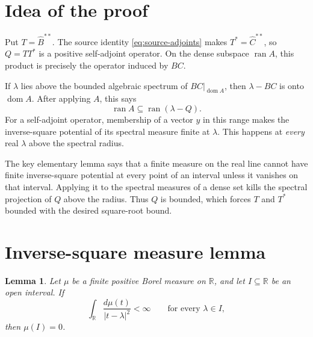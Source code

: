 \documentclass[11pt]{article}
\newtheorem{lemma}{Lemma}
\newcommand{\R}{\mathbb R}
\newcommand{\domA}{\operatorname{dom}A}
\newcommand{\ran}{\operatorname{ran}}
\begin{document}
\section*{Idea of the proof}

Put \(T=\widehat B^{**}\).  The source identity
\eqref{eq:source-adjoints} makes \(T^*=\widehat C^{**}\), so
\(Q=TT^*\) is a positive self-adjoint operator.  On the dense subspace
\(\ran A\), this product is precisely the operator induced by \(BC\).

If \(\lambda\) lies above the bounded algebraic spectrum of
\(BC|_{\domA}\), then \(\lambda-BC\) is onto \(\domA\).  After applying \(A\),
this says
\[
 \ran A\subseteq\ran(\lambda-Q).
\]
For a self-adjoint operator, membership of a vector \(y\) in this range makes
the inverse-square potential of its spectral measure finite at \(\lambda\).
This happens at \emph{every} real \(\lambda\) above the spectral radius.

The key elementary lemma says that a finite measure on the real line cannot
have finite inverse-square potential at every point of an interval unless it
vanishes on that interval.  Applying it to the spectral measures of a dense
set kills the spectral projection of \(Q\) above the radius.  Thus \(Q\) is
bounded, which forces \(T\) and \(T^*\) bounded with the desired square-root
bound.

\section*{Inverse-square measure lemma}

\begin{lemma}\label{lem:measure}
Let \(\mu\) be a finite positive Borel measure on \(\R\), and let
\(I\subseteq\R\) be an open interval.  If
\begin{equation}\label{eq:potential}
 \int_{\R}\frac{d\mu(t)}{|t-\lambda|^2}<\infty
 \qquad\text{for every }\lambda\in I,
\end{equation}
then \(\mu(I)=0\).
\end{lemma}
\end{document}
